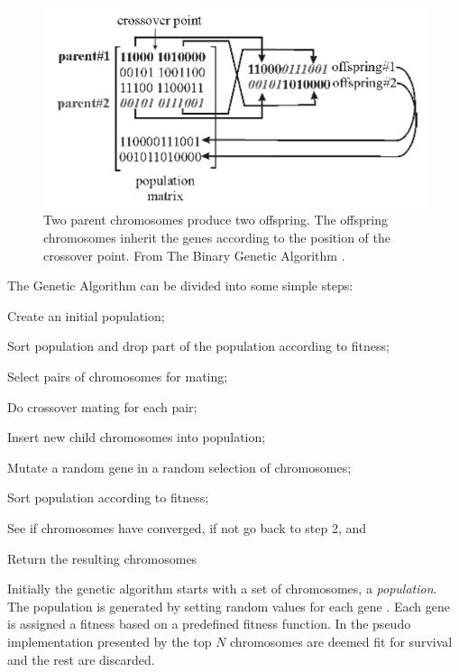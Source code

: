\begin{figure}[!h]
  \begin{center}
    \includegraphics[totalheight=0.175\textheight]{figures/crossover}
  \end{center}
  \caption{Two parent chromosomes produce two offspring. The offspring chromosomes inherit the genes according to the position of the crossover point. From The Binary Genetic Algorithm \protect \cite[p. 42]{Haupt2004a}.}
  \label{fig:crossover}
\end{figure}

The Genetic Algorithm can be divided into some simple steps:
\begin{inparaenum}[\itshape 1\upshape)]
\item Create an initial population;
\item Sort population and drop part of the population according to fitness;
\item Select pairs of chromosomes for mating;
\item Do crossover mating for each pair;
\item Insert new child chromosomes into population;
\item Mutate a random gene in a random selection of chromosomes;
\item Sort population according to fitness;
\item See if chromosomes have converged, if not go back to step 2, and
\item Return the resulting chromosomes
\end{inparaenum}

Initially the genetic algorithm starts with a set of chromosomes, a \textit{population}. The population is generated by setting random values for each gene \cite{Haupt2004a,Negnevitsky2002,Goldberg1989}. Each gene is assigned a fitness based on a predefined fitness function. In the pseudo implementation presented by \citeauthor{Haupt2004a} the top \(N\) chromosomes are deemed fit for survival and the rest are discarded.

